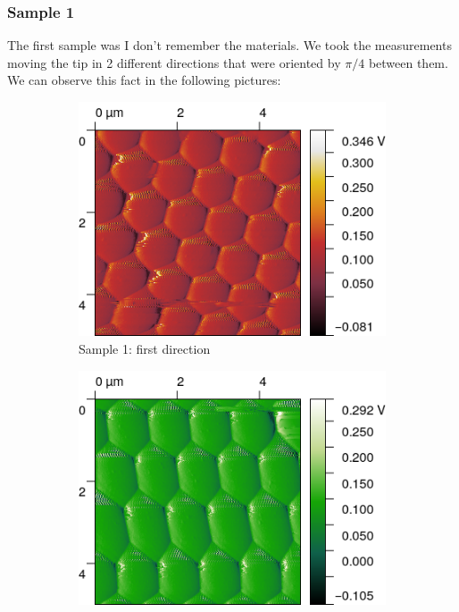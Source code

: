 \documentclass[11pt,a4paper]{article}
\begin{document}
\subsubsection{Sample 1}
The first sample was {\color{Red} I don't remember the materials}. We took the measurements moving the tip in 2 different directions that were oriented by $\pi /4$ between them. We can observe this fact in the following pictures:
\begin{figure}[H]
\centering
\begin{subfigure}[b]{0.45\textwidth}
\includegraphics[width=\textwidth]{sm_sample1}
\caption{Sample 1: first direction}
\label{fig:}
\end{subfigure}
\begin{subfigure}[b]{0.45\textwidth}
\includegraphics[width=\textwidth]{sm_sample1_dir2}

\end{subfigure}
\end{figure}
\end{document}
